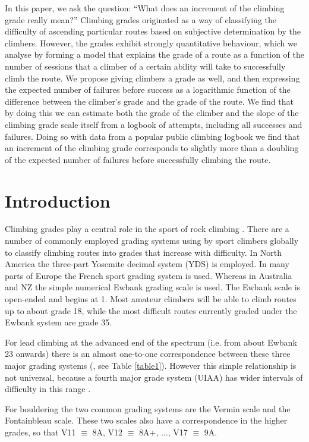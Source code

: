 \documentclass{article}
\begin{document}
In this paper, we ask the question: ``What does an increment of the climbing grade really mean?''  Climbing grades originated as a way of classifying the difficulty of ascending particular routes based on subjective determination by the climbers.  However, the grades exhibit strongly quantitative behaviour, which we analyse by forming a model that explains the grade of a route as a function of the number of sessions that a climber of a certain ability will take to successfully climb the route. We propose giving climbers a grade as well, and then expressing the expected number of failures before success as a logarithmic function of the difference between the climber's grade and the grade of the route. We find that by doing this we can estimate both the grade of the climber and the slope of the climbing grade scale itself from a logbook of attempts, including all successes and failures. Doing so with data from a popular public climbing logbook we find that an increment of the climbing grade corresponds to slightly more than a doubling of the expected number of failures before successfully climbing the route.

\section*{Introduction}

Climbing grades play a central role in the sport of rock climbing \cite{delignieres1993psychophysical,draper2015comparative}. There are a number of commonly employed grading systems using by sport climbers globally to classify climbing routes into grades that increase with difficulty. In North America the three-part Yosemite decimal system (YDS) is employed. In many parts of Europe the French sport grading system is used. Whereas in Australia and NZ the simple numerical Ewbank grading scale is used. The Ewbank scale is open-ended and begins at 1. Most amateur climbers will be able to climb routes up to about grade 18, while the most difficult routes currently graded under the Ewbank system are grade 35. 

For lead climbing at the advanced end of the spectrum (i.e. from about Ewbank 23 onwards) there is an almost one-to-one correspondence between these three major grading systems (\cite{draper2015comparative}, see Table \ref{table1}). However this simple relationship is not universal, because a fourth major grade system (UIAA) has wider intervals of difficulty in this range \cite{draper2015comparative}.

For bouldering the two common grading systems are the Vermin scale and the Fontainbleau scale. These two scales also have a correspondence in the higher grades, so that V11 $\equiv$ 8A, V12 $\equiv$ 8A+, $\dots$, V17 $\equiv$ 9A.
\end{document}
